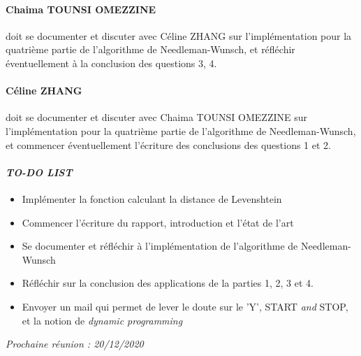 \paragraph*{Chaima TOUNSI OMEZZINE} doit se documenter et discuter avec Céline ZHANG sur l'implémentation pour la quatrième partie de l'algorithme de Needleman-Wunsch, et réfléchir éventuellement à la conclusion des questions 3, 4.

\paragraph*{Céline ZHANG} doit se documenter et discuter avec Chaima TOUNSI OMEZZINE sur l'implémentation pour la quatrième partie de l'algorithme de Needleman-Wunsch, et commencer éventuellement l'écriture des conclusions des questions 1 et 2.

\paragraph{\emph{TO-DO LIST}}
\begin{itemize}
    \item Implémenter la fonction calculant la distance de Levenshtein
    \item Commencer l'écriture du rapport, introduction et l'état de l'art
    \item Se documenter et réfléchir à l'implémentation de l'algorithme de Needleman-Wunsch
    \item Réfléchir sur la conclusion des applications de la parties 1, 2, 3 et 4.
    \item Envoyer un mail qui permet de lever le doute sur le 'Y', START \textsl{and} STOP, et la notion de \textsl{dynamic programming}
\end{itemize}

\emph{Prochaine réunion : 20/12/2020}\\

% 